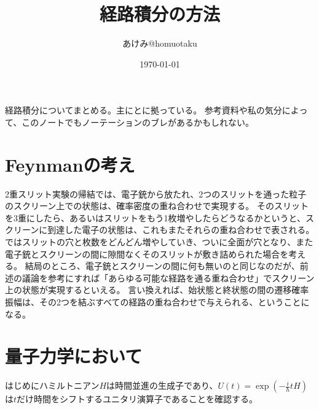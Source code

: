 \documentclass[10pt]{jsarticle}
\title{経路積分の方法}
\author{あけみ@homuotaku}
\date{\today}
\numberwithin{equation}{section}%
\begin{document}
\maketitle
経路積分についてまとめる。主に\cite{QFT-kashiwa}と\cite{QFT-sakamoto}に拠っている。
参考資料や私の気分によって、このノートでもノーテーションのブレがあるかもしれない。
\tableofcontents
\section{Feynmanの考え}
2重スリット実験の帰結では、電子銃から放たれ、2つのスリットを通った粒子のスクリーン上での状態は、確率密度の重ね合わせで実現する。
そのスリットを3重にしたら、あるいはスリットをもう1枚増やしたらどうなるかというと、スクリーンに到達した電子の状態は、これもまたそれらの重ね合わせで表される。
ではスリットの穴と枚数をどんどん増やしていき、ついに全面が穴となり、また電子銃とスクリーンの間に隙間なくそのスリットが敷き詰められた場合を考える。
結局のところ、電子銃とスクリーンの間に何も無いのと同じなのだが、前述の議論を参考にすれば「あらゆる可能な経路を通る重ね合わせ」でスクリーン上の状態が実現するといえる。
言い換えれば、始状態と終状態の間の遷移確率振幅は、その2つを結ぶすべての経路の重ね合わせで与えられる、ということになる。
\section{量子力学において}
はじめにハミルトニアン$H$は時間並進の生成子であり、$U(t)=\exp{(-\frac{i}{\hbar}tH)}$は$t$だけ時間をシフトするユニタリ演算子であることを確認する。
\end{document}
